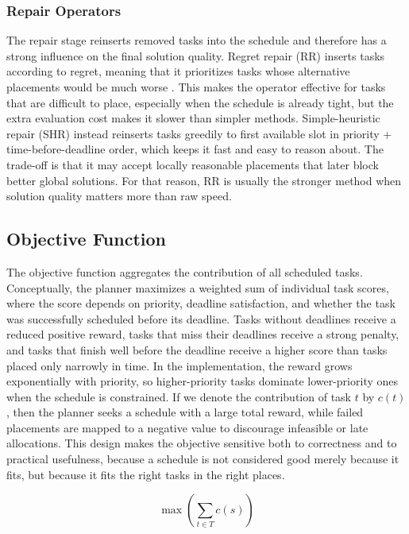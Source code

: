 \documentclass{article}
\begin{document}
\subsubsection{Repair Operators}
The repair stage reinserts removed tasks into the schedule and therefore has a strong influence on the final solution quality. Regret repair (RR) inserts tasks according to regret, meaning that it prioritizes tasks whose alternative placements would be much worse \cite{potvin1993,diana2004}. This makes the operator effective for tasks that are difficult to place, especially when the schedule is already tight, but the extra evaluation cost makes it slower than simpler methods. Simple-heuristic repair (SHR) instead reinserts tasks greedily to first available slot in priority + time-before-deadline order, which keeps it fast and easy to reason about. The trade-off is that it may accept locally reasonable placements that later block better global solutions. For that reason, RR is usually the stronger method when solution quality matters more than raw speed.

\subsection{Objective Function}
The objective function aggregates the contribution of all scheduled tasks. Conceptually, the planner maximizes a weighted sum of individual task scores, where the score depends on priority, deadline satisfaction, and whether the task was successfully scheduled before its deadline. Tasks without deadlines receive a reduced positive reward, tasks that miss their deadlines receive a strong penalty, and tasks that finish well before the deadline receive a higher score than tasks placed only narrowly in time. In the implementation, the reward grows exponentially with priority, so higher-priority tasks dominate lower-priority ones when the schedule is constrained. If we denote the contribution of task $t$ by $c(t)$, then the planner seeks a schedule with a large total reward, while failed placements are mapped to a negative value to discourage infeasible or late allocations. This design makes the objective sensitive both to correctness and to practical usefulness, because a schedule is not considered good merely because it fits, but because it fits the right tasks in the right places.

\begin{equation*}
\max\left( \sum_{t \in T} c(s) \right)
\end{equation*}
\end{document}
